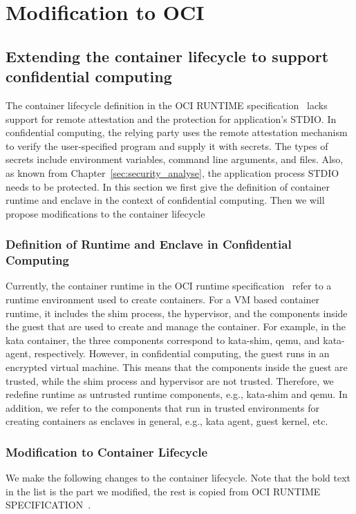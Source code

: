 \section{Modification to OCI}

\subsection{Extending the container lifecycle to support confidential computing}
The container lifecycle definition in the OCI RUNTIME specification~\cite*{oci-runtime-spec} lacks support for remote attestation and the protection for application’s STDIO. In confidential computing, the relying party uses the remote 
attestation mechanism to verify the user-specified program and supply it with secrets. The types of secrets include environment variables, command line arguments, and files. Also, as known from Chapter~\ref*{sec:security_analyse}, the application 
process STDIO needs to be protected. In this section we first give the definition of container runtime and enclave in the context of confidential computing. Then we will propose modifications to the container lifecycle


\subsubsection{Definition of Runtime and Enclave in Confidential Computing}

Currently, the container runtime in the OCI runtime specification~\cite*{oci-runtime-spec} refer to a runtime environment used to create containers. For a VM based container runtime, it includes the shim process, the hypervisor, and the components 
inside the guest that are used to create and manage the container. For example, in the kata container, the three components correspond to kata-shim, qemu, and kata-agent, respectively. However, in confidential computing, the guest runs in an 
encrypted virtual machine. This means that the components inside the guest are trusted, while the shim process and hypervisor are not trusted. Therefore, we redefine runtime as untrusted runtime components, e.g., kata-shim and qemu. 
In addition, we refer to the components that run in trusted environments for creating containers as enclaves in general, e.g., kata agent, guest kernel, etc.

\subsubsection{Modification to Container Lifecycle}
We make the following changes to the container lifecycle. Note that the bold text in the list is the part we modified, the rest is copied from OCI RUNTIME SPECIFICATION~\cite*{oci-runtime-spec}.

